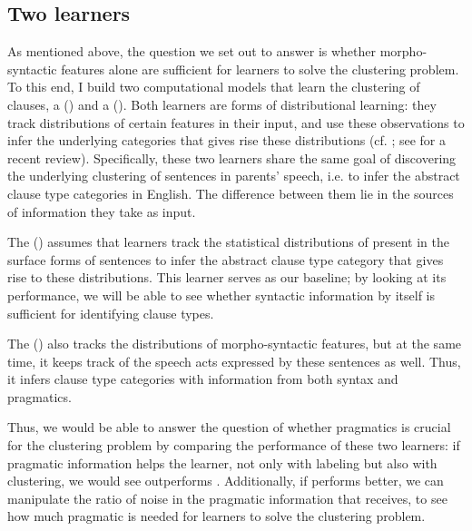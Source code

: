 \subsection{Two learners} 
\label{sec:engcl:bg:learners}
As mentioned above, the question we set out to answer is whether morpho-syntactic features alone are sufficient for learners to solve the clustering problem. To this end, I build two computational models that learn the clustering of clauses, a \text{\distlearner{}} (\dlearnerabbr{}) and a \text{\praglearner{}} (\plearnerabbr{}). Both learners are forms of distributional learning: they track distributions of certain features in their input, and use these observations to infer the underlying categories that gives rise these distributions
(cf. \cite{feldman2013,gagliardi2017modeling,perkins2022vmodel,perkins2019,nguyenwilson2021}; see \cite{pearl2020review} for a recent review). Specifically, these two learners share the same goal of discovering the underlying clustering of sentences in parents' speech, i.e. to infer the abstract clause type categories in English. The difference between them lie in the sources of information they take as input. 

The \tbf{\distlearner{}} (\dlearnerabbr{}) assumes that learners track the statistical distributions of  present in the surface forms of sentences to infer the abstract clause type category that gives rise to these distributions. This learner serves as our baseline; by looking at its performance, we will be able to see whether syntactic information by itself is sufficient for identifying clause types. 

The \tbf{\praglearner{}} (\plearnerabbr{}) also tracks the distributions of morpho-syntactic features, but at the same time, it keeps track of the speech acts expressed by these sentences as well. Thus, it infers clause type categories with information from both syntax and pragmatics. 

Thus, we would be able to answer the question of whether pragmatics is crucial for the clustering problem by comparing the performance of these two learners: if pragmatic information helps the learner, not only with labeling but also with clustering, we would see \plearnerabbr{} outperforms \dlearnerabbr. Additionally, if \plearnerabbr{} performs better, we can manipulate the ratio of noise in the pragmatic information that \plearnerabbr{} receives, to see how much pragmatic is needed for learners to solve the clustering problem. 


